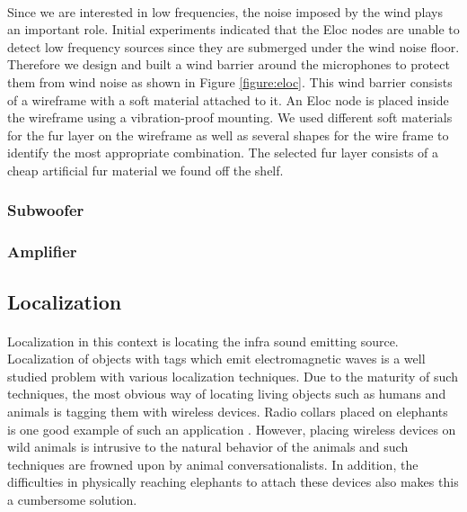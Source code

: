 \documentclass[12pt]{article}
\numberwithin{figure}{section}
\numberwithin{table}{section}
\begin{document}
\paragraph{}
Since we are interested in low frequencies, the noise imposed by the wind plays an important role. Initial experiments indicated that the Eloc nodes are unable to detect low frequency sources since they are submerged under the wind noise floor. Therefore we design and built a wind barrier around the microphones to protect them from wind noise as shown in Figure \ref{figure:eloc}. This wind barrier consists of a wireframe with a soft material attached to it. An Eloc node is placed inside the wireframe using a vibration-proof mounting. We used different soft materials for the fur layer on the wireframe as well as several shapes for the wire frame to identify the most appropriate combination. The selected fur layer consists of a cheap artificial fur material we found off the shelf.

\subsubsection{Subwoofer}

\subsubsection{Amplifier}


\newpage

\subsection{Localization}
\paragraph{}
Localization in this context is locating the infra sound emitting source. Localization of objects with tags which emit electromagnetic waves is a well studied problem with various localization techniques. Due to the maturity of such techniques,
the most obvious way of locating living objects such as humans and animals is tagging them with wireless devices. Radio collars placed on elephants is one good example of such an application \cite{32}. However, placing wireless devices on wild animals is intrusive to the natural behavior of the animals and such techniques are frowned upon by animal conversationalists. In addition, the difficulties in physically reaching elephants to attach these devices also makes this a cumbersome solution.
\end{document}
